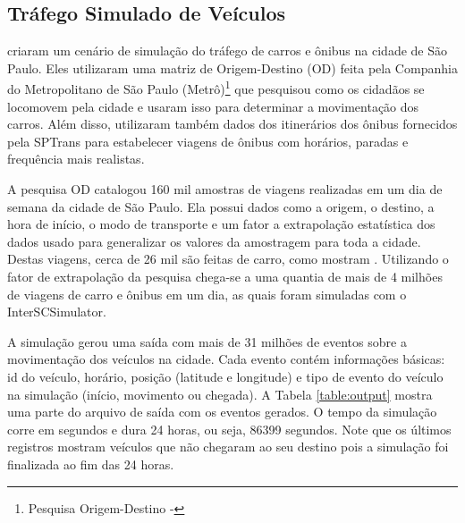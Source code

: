 \subsection{Tráfego Simulado de Veículos}
 \citet{santana2018courb} criaram um cenário de simulação do tráfego de carros
e ônibus na cidade de São Paulo. Eles utilizaram uma matriz de Origem-Destino
(OD) feita pela Companhia do Metropolitano de São Paulo
(Metrô)\footnote{Pesquisa Origem-Destino - } que pesquisou
como os cidadãos se locomovem pela cidade e usaram isso para determinar a
movimentação dos carros. Além disso, utilizaram também dados dos
itinerários dos ônibus fornecidos pela SPTrans para estabelecer viagens de
ônibus com horários, paradas e frequência mais realistas.

  A pesquisa OD catalogou 160 mil amostras de viagens realizadas em um dia de
semana da cidade de São Paulo. Ela possui dados como a origem, o destino, a hora
de início, o modo de transporte e um fator a extrapolação estatística dos dados
usado para generalizar os valores da amostragem para toda a cidade.
Destas viagens, cerca de 26 mil são feitas de carro, como mostram
\citet{santana2018courb}. Utilizando o fator de extrapolação da pesquisa
chega-se a uma quantia de mais de 4 milhões de viagens de carro e ônibus em um
dia, as quais foram simuladas com o InterSCSimulator.

  A simulação gerou uma saída com mais de 31 milhões de eventos sobre a
movimentação dos veículos na cidade.  Cada evento contém informações básicas:
id do veículo, horário, posição (latitude e longitude) e tipo de evento do
veículo na simulação (início, movimento ou chegada). A Tabela
\ref{table:output} mostra uma parte do arquivo de saída com os eventos gerados.
O tempo da simulação corre em segundos e dura 24 horas, ou seja, 86399
segundos.  Note que os últimos registros mostram veículos que não chegaram ao
seu destino pois a simulação foi finalizada ao fim das 24 horas.

